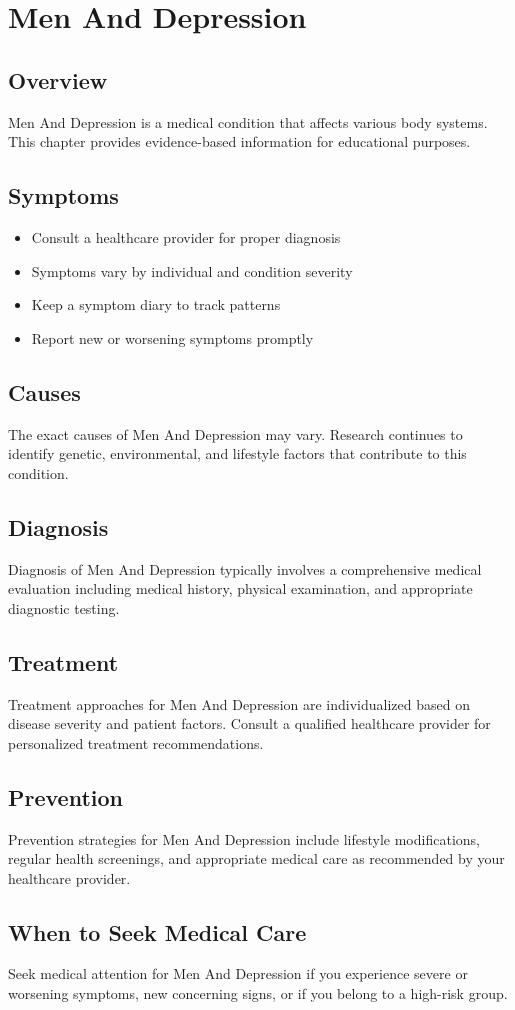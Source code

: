 \chapter{Men And Depression}

\section*{Overview}
Men And Depression is a medical condition that affects various body systems. This chapter provides evidence-based information for educational purposes.

\section*{Symptoms}
\begin{itemize}
  \item Consult a healthcare provider for proper diagnosis
  \item Symptoms vary by individual and condition severity
  \item Keep a symptom diary to track patterns
  \item Report new or worsening symptoms promptly
\end{itemize}

\section*{Causes}
The exact causes of Men And Depression may vary. Research continues to identify genetic, environmental, and lifestyle factors that contribute to this condition.

\section*{Diagnosis}
Diagnosis of Men And Depression typically involves a comprehensive medical evaluation including medical history, physical examination, and appropriate diagnostic testing.

\section*{Treatment}
Treatment approaches for Men And Depression are individualized based on disease severity and patient factors. Consult a qualified healthcare provider for personalized treatment recommendations.

\section*{Prevention}
Prevention strategies for Men And Depression include lifestyle modifications, regular health screenings, and appropriate medical care as recommended by your healthcare provider.

\section*{When to Seek Medical Care}
Seek medical attention for Men And Depression if you experience severe or worsening symptoms, new concerning signs, or if you belong to a high-risk group.
\clearpage

